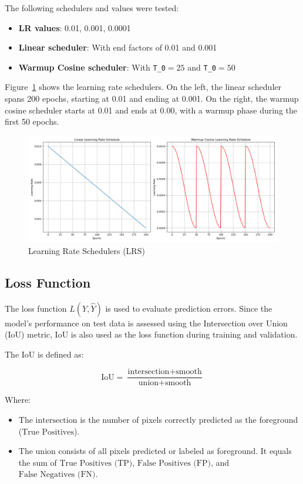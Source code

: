 The following schedulers and values were tested:
\begin{itemize}
    \item \textbf{LR values}: 0.01, 0.001, 0.0001
    \item \textbf{Linear scheduler}: With end factors of 0.01 and 0.001
    \item \textbf{Warmup Cosine scheduler}: With \texttt{T\_0}$= 25$ and \texttt{T\_0}$= 50$
\end{itemize}

Figure~\ref{fig:LRS} shows the learning rate schedulers. On the left, the linear scheduler spans 200 epochs, starting at 0.01 and ending at 0.001. On the right, the warmup cosine scheduler starts at 0.01 and ends at 0.00, with a warmup phase during the first 50 epochs.

\begin{figure}[H]
    \centering
    \includegraphics[width=0.9\linewidth]{PICTURES/LRS.png}
    \caption{Learning Rate Schedulers (LRS)}
    \label{fig:LRS}
\end{figure}
\subsection{Loss Function}\label{IoU}

The loss function \( L(Y, \hat{Y}) \) is used to evaluate prediction errors. Since the model's performance on test data is assessed using the Intersection over Union (IoU) metric, IoU is also used as the loss function during training and validation.

The IoU is defined as:

\begin{equation}
\text{IoU} = \frac{\text{intersection} + \text{smooth}}{\text{union} + \text{smooth}}
\label{eq:iou}
\end{equation}

\newpage
Where:
\begin{itemize}
    \item The \( \text{intersection} \) is the number of pixels correctly predicted as the foreground (\(\text{True Positives}\)).
    \item The \( \text{union} \) consists of all pixels predicted or labeled as foreground. It equals the sum of \( \text{True Positives (TP)} \), \( \text{False Positives (FP)} \), and \( \text{False Negatives (FN)} \).
\end{itemize}

